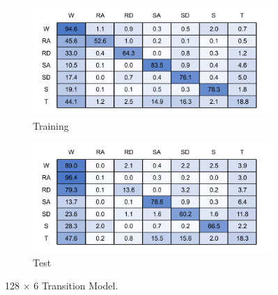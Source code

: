 
\begin{figure}[!hbt]
    \centering
    \begin{subfigure}{.45\textwidth}
        \centering
        \includegraphics[width=\textwidth]{content/4-LSTM_Behaviour/results/conf_matricies/Training_128x6_T.pdf}
        \caption{Training}
        \label{fig:tran_model_conf_matrix_training_128x6}
    \end{subfigure}
    \begin{subfigure}{.45\textwidth}
        \centering
        \includegraphics[width=\textwidth]{content/4-LSTM_Behaviour/results/conf_matricies/Test_128x6_T.pdf}
        \caption{Test}
        \label{fig:tran_model_conf_matrix_test_128x6}
    \end{subfigure}
    \caption{128 $\times$ 6 Transition Model.}
    \label{fig:128x6_transition_confusion_matrix}
\end{figure}
